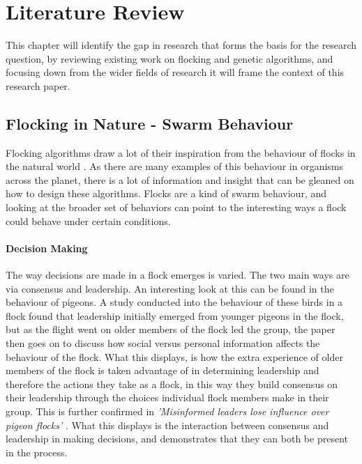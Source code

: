 


\section{Literature Review}
This chapter will identify the gap in research that forms the basis for the research question, by reviewing existing work on flocking and genetic algorithms, and focusing down from the wider fields of research it will frame the context of this research paper.

\subsection{Flocking in Nature - Swarm Behaviour}
Flocking algorithms draw a lot of their inspiration from the behaviour of flocks in the natural world \citep{flake1998computational}. As there are many examples of this behaviour in organisms across the planet, there is a lot of information and insight that can be gleaned on how to design these algorithms. Flocks are a kind of swarm behaviour, and looking at the broader set of behaviors can point to the interesting ways a flock could behave under certain conditions.

\paragraph{Decision Making}
The way decisions are made in a flock emerges is varied. The two main ways are via consensus and leadership. An interesting look at this can be found in the behaviour of pigeons. A study conducted into the behaviour of these birds in a flock \citep{Jorge2414} found that leadership initially emerged from younger pigeons in the flock, but as the flight went on older members of the flock led the group, the paper then goes on to discuss how social versus personal information affects the behaviour of the flock. What this displays, is how the extra experience of older members of the flock is taken advantage of in determining leadership and therefore the actions they take as a flock, in this way they build consensus on their leadership through the choices individual flock members make in their group. This is further confirmed in \textit{ 'Misinformed leaders lose influence over pigeon flocks' }\citet{doi:10.1098/rsbl.2016.0544}. What this displays is the interaction between consensus and leadership in making decisions, and demonstrates that they can both be present in the process.
	

